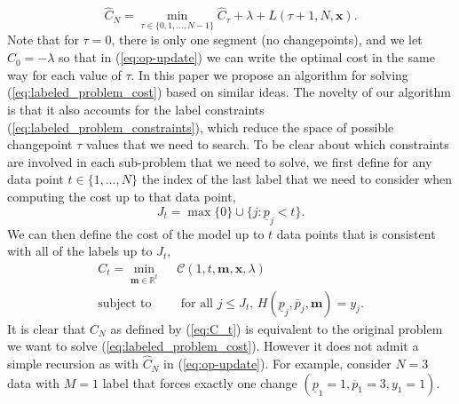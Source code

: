 \documentclass[12pt]{article}
\begin{document}
\begin{equation}
  \hat C_N
  = \min_{\tau\in \{0, 1, \dots, N-1\} }
  \hat C_\tau +
  \lambda +
  L(\tau+1, N, \mathbf x).
  \label{eq:op-update}
\end{equation}
Note that for $\tau=0$, there is only one segment (no changepoints), and we let $\hat C_0=-\lambda$ so that in (\ref{eq:op-update}) we can write the optimal cost in the same way for each value of $\tau$. 
In this paper we propose an algorithm for solving (\ref{eq:labeled_problem_cost}) based on similar ideas. The novelty of our algorithm is that it also accounts for the label constraints (\ref{eq:labeled_problem_constraints}), which reduce the space of possible changepoint $\tau$ values that we need to search. 
To be clear about which constraints are involved in each sub-problem that we need to solve, we first define for any data point $t\in\{1,\dots, N\}$ the index of the last label that we need to consider when computing the cost up to that data point,
\begin{equation}
    \label{eq:J_t}
    J_t = \max \{0\} \cup \{j: \underline p_j < t\}.
\end{equation}
We can then define the cost of the model up to $t$ data points that is consistent with all of the labels up to $J_t$,
\begin{align}
 C_t = \min_{
  \mathbf m\in\mathbb R^{t}
  } &\ \ 
  \label{eq:C_t}
\mathcal C(1, t, \mathbf m, \mathbf x, \lambda)
\\
    \text{subject to} 
& \ \ \text{ for all } j \leq J_t,\, 
H(\underline p_j, \overline p_j, \mathbf m)=y_j.
\end{align}
It is clear that $C_N$ as defined by (\ref{eq:C_t}) is equivalent to the original problem we want to solve (\ref{eq:labeled_problem_cost}). 
However it does not admit a simple recursion as with $\hat C_N$ in (\ref{eq:op-update}).
For example, consider $N=3$ data with $M=1$ label that forces exactly one change $(\underline p_1=1, \overline p_1=3, y_1=1)$. 
\end{document}

